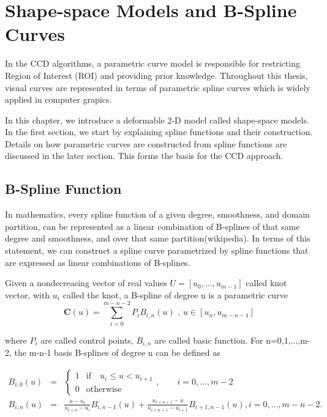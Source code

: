 \chapter{Shape-space Models and B-Spline Curves}
\label{chapter:bspline}
In the CCD algorithms, a parametric curve model is responsible for
restricting Region of Interest (ROI) and providing prior knowledge. 
Throughout this thesis, visual curves are represented in terms of
parametric spline curves which is widely applied in computer grapics.

In this chapter, we introduce a deformable 2-D model called
shape-space models.  In the first section, we start by explaining
spline functions and their construction. Details on how parametric
curves are constructed from spline functions are discussed in the
later section. This forms the basis for the CCD approach.
\section{B-Spline Function}
\label{sec:bsc}
In mathematics, every spline function of a given degree,
smoothness, and domain partition, can be represented as a linear
combination of B-splines of that same degree and smoothness, and over
that same partition(wikipedia). In terms of this statement, we can
construct  a spline curve parametrized by spline functions that are
expressed as linear combinations of B-splines. 

Given a nondecreasing vector of real values $U = [u_0, \ldots,
u_{m-1}]$ called knot vector, with $u_i$ called the knot, a
B-spline of degree n is a parametric curve
\begin{equation}
  \label{eq:4.1}
  \mathbf{C}(u) =  \sum_{i=0}^{m-n-2} P_{i} B_{i,n}(u) \mbox{ , } u \in [u_{n},u_{m-n-1}]
\end{equation}

where $P_i$ are called control points, $B_{i,n}$ are called
basic function. For n=0,1,...,m-2, the m-n-1 basis B-splines of degree
n can be defined as 

\begin{eqnarray}
  \label{eq:4.2}
  B_{i,0}(u) &=&  \left\{
\begin{matrix} 
1 & \mathrm{if} \quad u_i \leq u < u_{i+1} \\
0 & \mathrm{otherwise} 
\end{matrix}
\right.,\qquad i=0,\ldots, m{-}2 \nonumber\\
B_{i,n}(u) &=& \frac{u - u_i}{u_{i+n} - u_i} B_{i,n-1}(u) + \frac{u_{i+n+1} - u}{u_{i+n+1} - u_{i+1}} B_{i+1,n-1}(u)
, i=0,\ldots, m{-}n{-}2.  
\end{eqnarray}


